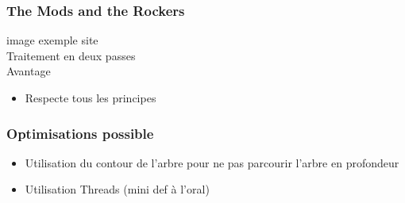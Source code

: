 \begin{frame}
	\frametitle{The Mods and the Rockers}
	image exemple site \\
	Traitement en deux passes\\
	Avantage
	\begin{itemize}
		\item Respecte tous les principes
	\end{itemize}
\end{frame}

\begin{frame}
	\frametitle{Optimisations possible}
	\begin{itemize}
		\item Utilisation du contour de l'arbre pour ne pas parcourir l'arbre en profondeur
		\item Utilisation Threads (mini def à l'oral)
	\end{itemize}
\end{frame}

